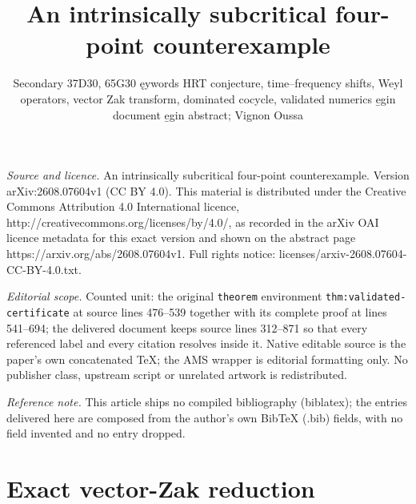 \documentclass[10pt,a4paper]{amsart}
\numberwithin{equation}{section}
\begin{document}
\title[An intrinsically subcritical four-point counterexample]{An intrinsically subcritical four-point counterexample}
\author{Secondary 37D30, 65G30 ęywords HRT conjecture, time--frequency shifts, Weyl operators, vector Zak transform, dominated cocycle, validated numerics e̱gin document e̱gin abstract; Vignon Oussa}
\date{}
\maketitle
\noindent\emph{Source and licence.} An intrinsically subcritical four-point counterexample. Version arXiv:2608.07604v1 (CC BY 4.0). This material is distributed under the Creative Commons Attribution 4.0 International licence, http://creativecommons.org/licenses/by/4.0/, as recorded in the arXiv OAI licence metadata for this exact version and shown on the abstract page https://arxiv.org/abs/2608.07604v1. Full rights notice: licenses/arxiv-2608.07604-CC-BY-4.0.txt.\par\smallskip
\noindent\textit{Editorial scope.} Counted unit: the original \texttt{theorem} environment \texttt{thm:validated-certificate} at source lines 476--539 together with its complete proof at lines 541--694; the delivered document keeps source lines 312--871 so that every referenced label and every citation resolves inside it. Native editable source is the paper's own concatenated TeX; the AMS wrapper is editorial formatting only. No publisher class, upstream script or unrelated artwork is redistributed.
\par\smallskip\noindent\textit{Reference note.} This article ships no compiled bibliography (biblatex); the entries delivered here are composed from the author's own BibTeX (.bib) fields, with no field invented and no entry dropped.
\section{Exact vector-Zak reduction}
\label{sec:zak}
\end{document}

